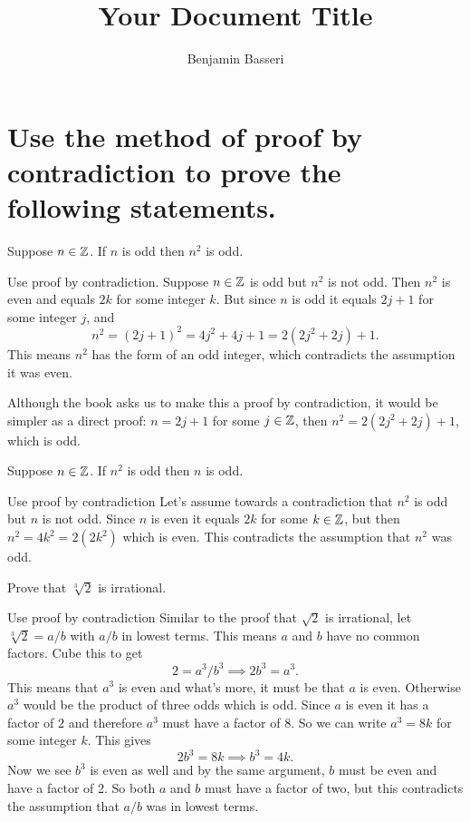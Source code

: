 \documentclass{article}
\title{Your Document Title}
\author{Benjamin Basseri}
\begin{document}
\maketitle

\section{Use the method of proof by contradiction to prove the following statements.}

\begin{problem}
Suppose $n \in \mathbb{Z}$. If $n$ is odd then $n^2$ is odd.
\end{problem}

\begin{solution}{Use proof by contradiction.}
  Suppose $n \in \mathbb{Z}$ is odd but $n^2$ is not odd. Then $n^2$ is even and equals $2k$ for some integer $k$. But since $n$ is odd it equals $2j + 1$ for some integer $j$, and
  $$n^2 = (2j + 1)^2 = 4j^2 + 4j + 1 = 2(2j^2 + 2j) + 1.$$
  This means $n^2$ has the form of an odd integer, which contradicts the assumption it was even.

  Although the book asks us to make this a proof by contradiction, it would be simpler as a direct proof: $n = 2j + 1$ for some $j \in \mathbb{Z}$, then $n^2 = 2(2j^2 + 2j) + 1$, which is odd.
\end{solution}

\begin{problem}
Suppose $n \in \mathbb{Z}$. If $n^2$ is odd then $n$ is odd.
\end{problem}

\begin{solution}{Use proof by contradiction}
  Let's assume towards a contradiction that $n^2$ is odd but $n$ is not odd. Since $n$ is even it equals $2k$ for some $k \in \mathbb{Z}$, but then $n^2 = 4k^2 = 2(2k^2)$ which is even. This contradicts the assumption that $n^2$ was odd.
\end{solution}

\begin{problem}
Prove that $\sqrt[3]{2}$ is irrational.
\end{problem}

\begin{solution}{Use proof by contradiction}
  Similar to the proof that $\sqrt{2}$ is irrational, let $\sqrt[3]{2} = a/b$ with $a/b$ in lowest terms. This means $a$ and $b$ have no common factors. Cube this to get
  $$2 = a^3 / b^3 \implies 2b^3 = a^3.$$
  This means that $a^3$ is even and what's more, it must be that $a$ is even. Otherwise $a^3$ would be the product of three odds which is odd. Since $a$ is even it has a factor of $2$ and therefore $a^3$ must have a factor of 8. So we can write $a^3 = 8k$ for some integer $k$. This gives
  $$2b^3 = 8k \implies b^3 = 4k.$$
  Now we see $b^3$ is even as well and by the same argument, $b$ must be even and have a factor of 2. So both $a$ and $b$ must have a factor of two, but this contradicts the assumption that $a/b$ was in lowest terms.
\end{solution}
\end{document}
